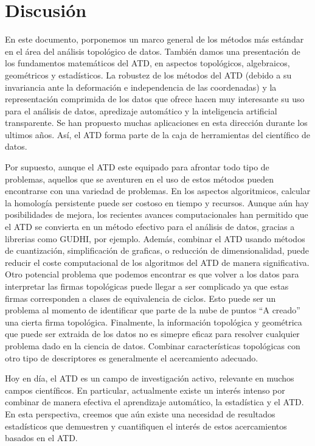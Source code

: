 \chapter{Discusi\'on}

En este documento, porponemos un marco general de los m\'etodos m\'as est\'andar
en el \'area del an\'alisis topol\'ogico de datos.
Tambi\'en damos una presentaci\'on de los fundamentos matem\'aticos del ATD,
en aspectos topol\'ogicos, algebraicos, geom\'etricos y estad\'isticos.
La robustez de los m\'etodos del ATD (debido a su invariancia ante la deformaci\'on
e independencia de las coordenadas) y la representaci\'on comprimida de los datos que ofrece
hacen muy interesante su uso para el an\'alisis de datos, apredizaje autom\'atico y
la inteligencia artificial transparente.
Se han propuesto muchas aplicaciones en esta direcci\'on durante los ultimos a\~{n}os.
As\'i, el ATD forma parte de la caja de herramientas del cient\'ifico de datos.

Por supuesto, aunque el ATD este equipado para afrontar todo tipo de problemas,
aquellos que se aventuren en el uso de estos m\'etodos pueden encontrarse con
una variedad de problemas.
En los aspectos algoritmicos, calcular la homolog\'ia persistente puede ser costoso
en tiempo y recursos.
Aunque a\'un hay posibilidades de mejora, los recientes avances computacionales han
permitido que el ATD se convierta en un m\'etodo efectivo para el an\'alisis de datos,
gracias a librerias como GUDHI, por ejemplo.
Adem\'as, combinar el ATD usando m\'etodos de cuantizaci\'on, simplificaci\'on de graficas,
o reducci\'on de dimensionalidad, puede reducir el coste computacional de los algoritmos del
ATD de manera significativa.
Otro potencial problema que podemos encontrar es que volver a los datos para interpretar
las firmas topol\'ogicas puede llegar a ser complicado ya que estas firmas corresponden
a clases de equivalencia de ciclos.
Esto puede ser un problema al momento de identificar que parte de la nube de puntos
``A creado'' una cierta firma topol\'ogica.
Finalmente, la informaci\'on topol\'ogica y geom\'etrica que puede ser extraida de los datos
no es simepre eficaz para resolver cualquier problema dado en la ciencia de datos.
Combinar caracter\'isticas topol\'ogicas con otro tipo de descriptores es generalmente
el acercamiento adecuado.

Hoy en d\'ia, el ATD es un campo de investigaci\'on activo, relevante en muchos campos
cient\'ificos.
En particular, actualmente existe un inter\'es intenso por combinar de manera efectiva el
aprendizaje autom\'atico, la estad\'istica y el ATD.
En esta perspectiva, creemos que a\'un existe una necesidad de resultados estad\'isticos
que demuestren y cuantifiquen el inter\'es de estos acercamientos basados en el ATD.